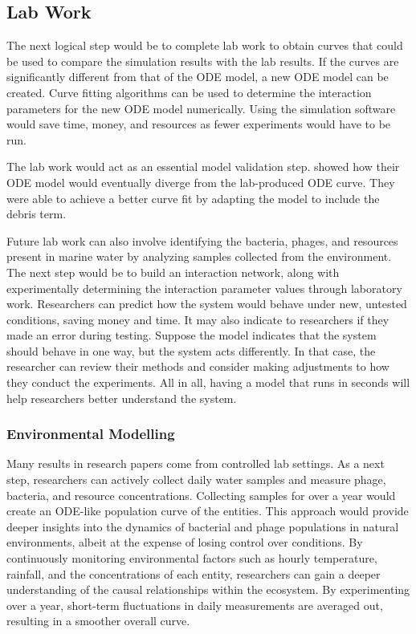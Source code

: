 \subsection{Lab Work}
The next logical step would be to complete lab work to obtain curves that could be used to compare the simulation results with the lab results. 
If the curves are significantly different from that of the ODE model, a new ODE model can be created. 
Curve fitting algorithms can be used to determine the interaction parameters for the new ODE model numerically. 
Using the simulation software would save time, money, and resources as fewer experiments would have to be run. 

The lab work would act as an essential model validation step. 
\citet{deyEmergentHigherorderInteractions2025} showed how their ODE model would eventually diverge from the lab-produced ODE curve. 
They were able to achieve a better curve fit by adapting the model to include the debris term. 

Future lab work can also involve identifying the bacteria, phages, and resources present in marine water by analyzing samples collected from the environment. 
The next step would be to build an interaction network, along with experimentally determining the interaction parameter values through laboratory work. 
Researchers can predict how the system would behave under new, untested conditions, saving money and time. 
It may also indicate to researchers if they made an error during testing. 
Suppose the model indicates that the system should behave in one way, but the system acts differently. In that case, the researcher can review their methods and consider making adjustments to how they conduct the experiments. 
All in all, having a model that runs in seconds will help researchers better understand the system. 

\subsubsection{Environmental Modelling}
Many results in research papers come from controlled lab settings. 
As a next step, researchers can actively collect daily water samples and measure phage, bacteria, and resource concentrations. 
Collecting samples for over a year would create an ODE-like population curve of the entities. 
This approach would provide deeper insights into the dynamics of bacterial and phage populations in natural environments, albeit at the expense of losing control over conditions. 
By continuously monitoring environmental factors such as hourly temperature, rainfall, and the concentrations of each entity, researchers can gain a deeper understanding of the causal relationships within the ecosystem.
By experimenting over a year, short-term fluctuations in daily measurements are averaged out, resulting in a smoother overall curve.


